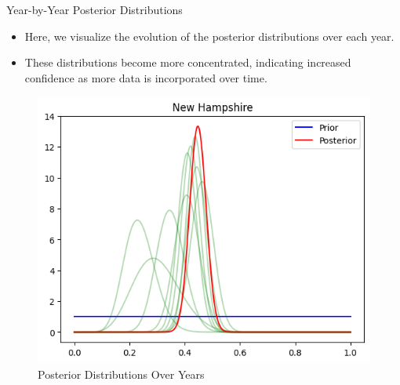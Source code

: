 \begin{frame}{Year-by-Year Posterior Distributions}

  \begin{itemize}
    \item Here, we visualize the evolution of the posterior distributions over each year.
    \item These distributions become more concentrated, indicating increased confidence as more data is incorporated over time.
  \end{itemize}

\begin{figure}
  \centering
  \includegraphics[width=.6\linewidth]{../Report/images/posterior-years.png}
  \caption{Posterior Distributions Over Years}
\end{figure}

  
\end{frame}
